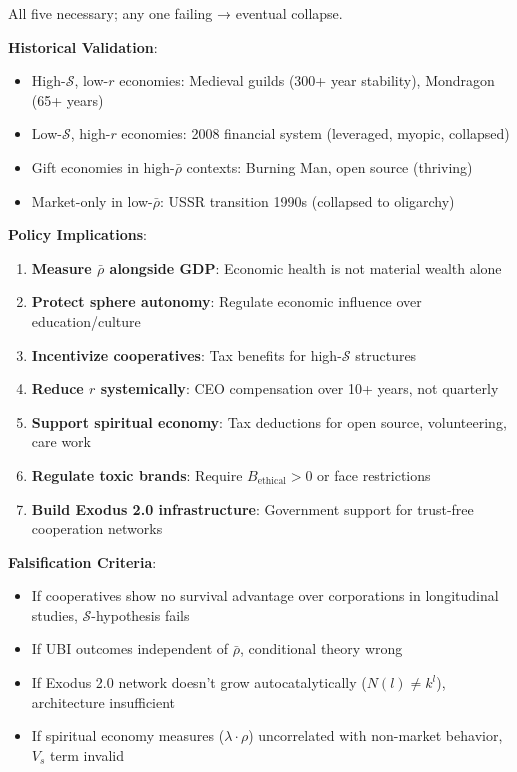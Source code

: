 \documentclass[11pt,a4paper]{article}
\theoremstyle{definition}
\theoremstyle{remark}
\begin{document}
\begin{enumerate}
\begin{mdframed}[backgroundcolor=green!10,linewidth=2pt,linecolor=green!70!black]
All five necessary; any one failing → eventual collapse.

\textbf{Historical Validation}:
\begin{itemize}[nosep]
    \item High-\(\mathcal{S}\), low-\(r\) economies: Medieval guilds (300+ year stability), Mondragon (65+ years)
    \item Low-\(\mathcal{S}\), high-\(r\) economies: 2008 financial system (leveraged, myopic, collapsed)
    \item Gift economies in high-\(\bar{\rho}\) contexts: Burning Man, open source (thriving)
    \item Market-only in low-\(\bar{\rho}\): USSR transition 1990s (collapsed to oligarchy)
\end{itemize}

\textbf{Policy Implications}:
\begin{enumerate}[nosep]
    \item \textbf{Measure \(\bar{\rho}\) alongside GDP}: Economic health is not material wealth alone
    \item \textbf{Protect sphere autonomy}: Regulate economic influence over education/culture
    \item \textbf{Incentivize cooperatives}: Tax benefits for high-\(\mathcal{S}\) structures
    \item \textbf{Reduce \(r\) systemically}: CEO compensation over 10+ years, not quarterly
    \item \textbf{Support spiritual economy}: Tax deductions for open source, volunteering, care work
    \item \textbf{Regulate toxic brands}: Require \(B_{\text{ethical}} > 0\) or face restrictions
    \item \textbf{Build Exodus 2.0 infrastructure}: Government support for trust-free cooperation networks
\end{enumerate}

\textbf{Falsification Criteria}:
\begin{itemize}[nosep]
    \item If cooperatives show no survival advantage over corporations in longitudinal studies, \(\mathcal{S}\)-hypothesis fails
    \item If UBI outcomes independent of \(\bar{\rho}\), conditional theory wrong
    \item If Exodus 2.0 network doesn't grow autocatalytically (\(N(l) \neq k^l\)), architecture insufficient
    \item If spiritual economy measures (\(\lambda \cdot \rho\)) uncorrelated with non-market behavior, \(V_s\) term invalid
\end{itemize}


\end{mdframed}
\end{enumerate}
\end{document}

